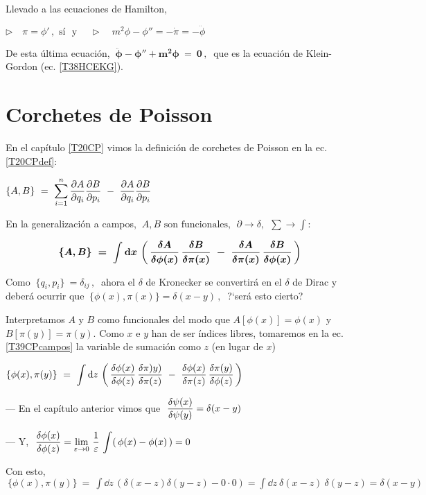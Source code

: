 Llevado a las ecuaciones de Hamilton,

$\displaystyle \triangleright \quad \pi=\phi'\, , \text{ sí } \text{ y }  \quad \triangleright \quad m^2\phi-\phi''=-\dot \pi = - \ddot \phi$

De esta última ecuación, $\ \boldsymbol{ \ddot \phi - \phi'' + m^2 \phi \ = \ 0 }\, , \ $ que es la ecuación de Klein-Gordon (ec. \ref{T38HCEKG}).

\vspace{5mm}
\section{Corchetes de Poisson}

En el capítulo \ref{T20CP} vimos la definición de corchetes de Poisson en la ec. \ref{T20CPdef}:

$\{A,B\} \ = \ \displaystyle \sum_{i=1}^n \pdv{A}{q_i}\pdv{B}{p_i} \ - \ \pdv{A}{q_i}\pdv{B}{p_i}$

En la generalización a campos, $\ A,B \text{ son funcionales},\ \ \partial \to \delta ,\ \ \sum \to \int$:

\begin{equation}
\label{T39CPcampos}	
\boldsymbol{
\{A,B\} \ = \ \int \dd x \, \left( \, \fdv{A}{\phi(x)} \, \fdv{B}{\pi(x)} \ - \ \fdv{A}{\pi(x)}\, \fdv{B}{\phi(x)} \, \right)
}
\end{equation}


Como $\ \{q_i,p_i\}\ =  \delta_{ij} \, , \  $ ahora el $\delta$ de Kronecker se convertirá en el $\delta$ de Dirac y deberá ocurrir que $\ \{\phi(x),\pi(x)\} = \delta(x-y)\, , \  $ ?`será esto cierto?

Interpretamos $A$ y $B$ como funcionales del modo que $A[\phi(x)]=\phi(x)$ y $B[\pi(y)]=\pi(y)$. Como $x$ e $y$ han de ser índices libres, tomaremos en la ec. \ref{T39CPcampos} la variable de sumación como $z$ (en lugar de $x$)

$\displaystyle \{\phi(x),\pi(y)\} \ = \ \int \dd z \, \left( \, \fdv{\phi(x)}{\phi(z)} \, \fdv{\pi)y)}{\pi(z)} \ - \ \fdv{\phi(x)}{\pi(z)}\, \fdv{\pi(y)}{\phi(z)} \, \right)$


--- En el capítulo anterior vimos que $\ \displaystyle \fdv{\psi(x)}{\psi(y)}=\delta(x-y)\ $

--- Y, $\ \displaystyle \fdv{\phi(x)}{\phi(z)}=\lim_{\varepsilon\to 0} \, \dfrac 1 \varepsilon \, \int (\, \phi(x) - \phi(x) \, ) = 0$

Con esto, $\ \displaystyle  \{\phi(x),\pi(y)\} \ = \ \int \dd z \, (\delta(x-z)\delta(y-z)-0\cdot 0)=\int \dd z \ \delta(x-z)\ \delta(y-z) = \delta (x-y)$

